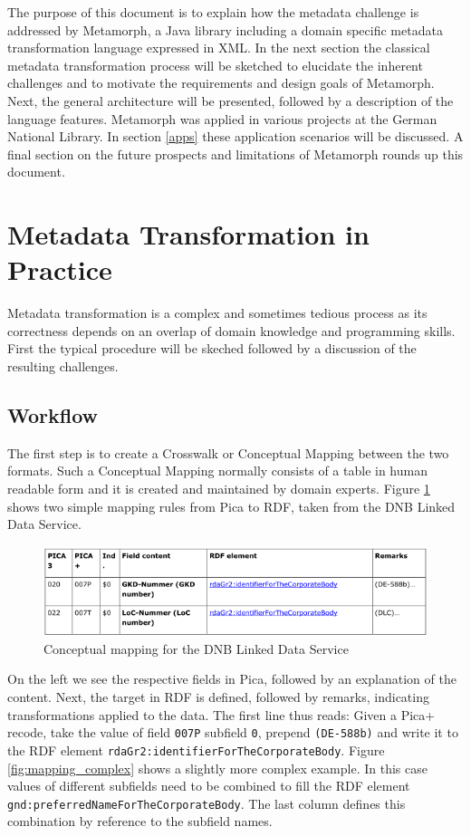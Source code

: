 \documentclass[12pt,a4paper]{article}
\begin{document}
The purpose of this document is to explain how the metadata challenge is addressed by Metamorph, a Java library including a domain specific metadata transformation language expressed in XML. In the next section the classical metadata transformation process will be sketched to elucidate the inherent challenges and to motivate the requirements and design goals of Metamorph. Next, the general architecture will be presented, followed by a description of the language features. Metamorph was applied in various projects at the German National Library. In section \ref{apps} these application scenarios will be discussed.
A final section on the future prospects and limitations of Metamorph rounds up this document.


\section{Metadata Transformation in Practice}

Metadata transformation is a complex and sometimes tedious process as its correctness depends on an overlap of domain knowledge and programming skills. First the typical procedure will be skeched followed by a discussion of the resulting challenges.


\subsection{Workflow}

The first step is to create a Crosswalk or Conceptual Mapping between the two formats. Such a Conceptual Mapping normally consists of a table in human readable form and it is created and maintained by domain experts. Figure \ref{fig:mapping_simple} shows two simple mapping rules from Pica to RDF, taken from the DNB Linked Data Service. 

\begin{figure}[htp]
\centering
\includegraphics[width=.8\textwidth]{figures/mapping_simple}
\caption{Conceptual mapping for the DNB Linked Data Service}\label{fig:mapping_simple}
\end{figure}

On the left we see the respective fields in Pica, followed by an explanation of the content. Next, the target in RDF is defined, followed by remarks, indicating transformations applied to the data. The first line thus reads: Given a Pica+ recode, take the value of field {\tt 007P} subfield {\tt 0}, prepend {\tt (DE-588b)} and write it to the RDF element {\tt rdaGr2:identifierForTheCorporateBody}.  Figure \ref{fig:mapping_complex} shows a slightly more complex example. In this case values of different subfields need to be combined to fill the RDF element {\tt gnd:preferredNameForTheCorporateBody}. The last column defines this combination by reference to the subfield names.
\end{document}
